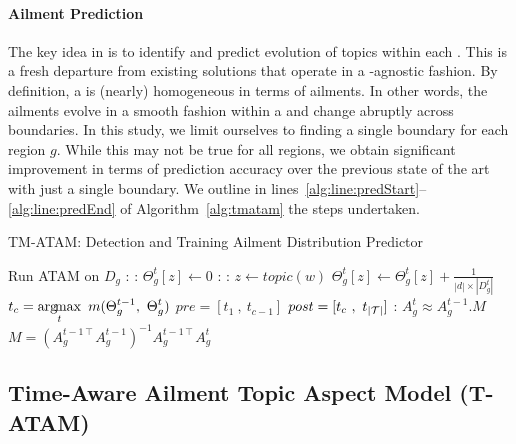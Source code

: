 \paragraph{Ailment Prediction}
The key idea in \tmatam is to identify \emph{\changes} and predict
evolution of topics within each \season. This is a fresh departure
from existing solutions that operate in a \season-agnostic fashion.
By definition, a \season is (nearly) homogeneous in terms
of ailments. In other words, the ailments evolve in a smooth fashion
within a \change and change abruptly across \change boundaries.
In this study, we limit ourselves to finding a single \change boundary for
each region $g$. While this may not be true for all regions, we obtain
significant improvement in terms of prediction accuracy over the previous
state of the art with just a single boundary.
We outline in lines~\ref{alg:line:predStart}--\ref{alg:line:predEnd} 
of Algorithm~\ref{alg:tmatam} the steps undertaken. 
\begin{algorithm}[t]
\caption{TM-ATAM: \change Detection and Training Ailment Distribution Predictor}
\label{alg:tmatam}
\begin{algorithmic}[1]
 \label{alg:line:start}
 \State Run ATAM on $D_g$\label{alg:line:atam}
 :\label{alg:line:tstart}
 :\label{alg:line:createThetaStart}
 \State $\Theta_g^t[z] \leftarrow 0$
 \EndFor
 :
 :
 \State $z \gets topic(w)$
 \State $\Theta_g^t[z] \gets \Theta_g^t[z] + \frac{1}{|d|\times |D_g^t|}$
 \EndFor
 \EndFor\label{alg:line:createThetaEnd}
 \EndFor
 \State $\displaystyle t_{c} = \argmax_t{\ m(\Theta_g^{t-1},\ \Theta_g^{t})}$\label{alg:line:ThetaDiff}
 \State $pre = [t_1\ ,\ t_{c-1}]$\label{alg:line:buildSeasonPre} 
 \State $post = [t_{c}\ , \ t_{|\mathcal{T}|}]$\label{alg:line:buildSeasonPost} 
 :\label{alg:line:predStart}
 \State $A_g^t\approx A_g^{t-1}.M$
 \State $M =(A_g^{t-1\intercal}A_g^{t-1})^{-1}A_g^{t-1\intercal}A_g^t$
 \EndFor\label{alg:line:predEnd}
\EndFor\label{alg:line:end}
\end{algorithmic}
\end{algorithm}

\subsection{Time-Aware Ailment Topic Aspect Model (T-ATAM)}

